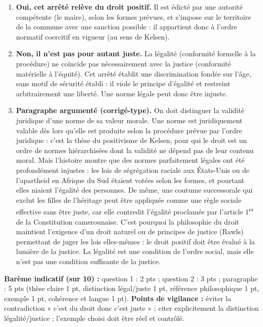 \documentclass[11pt]{article}
\begin{document}
\begin{corrige}
\begin{enumerate}
\item \textbf{Oui, cet arrêté relève du droit positif.} Il est édicté par une autorité compétente (le maire), selon les formes prévues, et s'impose sur le territoire de la commune avec une sanction possible : il appartient donc à l'ordre normatif coercitif en vigueur (au sens de Kelsen).
\item \textbf{Non, il n'est pas pour autant juste.} La légalité (conformité formelle à la procédure) ne coïncide pas nécessairement avec la justice (conformité matérielle à l'équité). Cet arrêté établit une discrimination fondée sur l'âge, sans motif de sécurité établi : il viole le principe d'égalité et restreint arbitrairement une liberté. Une norme légale peut donc être injuste.
\item \textbf{Paragraphe argumenté (corrigé-type).} On doit distinguer la validité juridique d'une norme de sa valeur morale. Une norme est juridiquement valable dès lors qu'elle est produite selon la procédure prévue par l'ordre juridique : c'est la thèse du positivisme de Kelsen, pour qui le droit est un ordre de normes hiérarchisées dont la validité ne dépend pas de leur contenu moral. Mais l'histoire montre que des normes parfaitement légales ont été profondément injustes : les lois de ségrégation raciale aux États-Unis ou de l'apartheid en Afrique du Sud étaient votées selon les formes, et pourtant elles niaient l'égalité des personnes. De même, une coutume successorale qui exclut les filles de l'héritage peut être appliquée comme une règle sociale effective sans être juste, car elle contredit l'égalité proclamée par l'article 1\textsuperscript{er} de la Constitution camerounaise. C'est pourquoi la philosophie du droit maintient l'exigence d'un droit naturel ou de principes de justice (Rawls) permettant de juger les lois elles-mêmes : le droit positif doit être évalué à la lumière de la justice. La légalité est une condition de l'ordre social, mais elle n'est pas une condition suffisante de la justice.
\end{enumerate}
\textbf{Barème indicatif (sur 10) :} question 1 : 2 pts ; question 2 : 3 pts ; paragraphe : 5 pts (thèse claire 1 pt, distinction légal/juste 1 pt, référence philosophique 1 pt, exemple 1 pt, cohérence et langue 1 pt).
\textbf{Points de vigilance :} éviter la contradiction « c'est du droit donc c'est juste » ; citer explicitement la distinction légalité/justice ; l'exemple choisi doit être réel et contrôlé.
\end{corrige}
\end{document}
